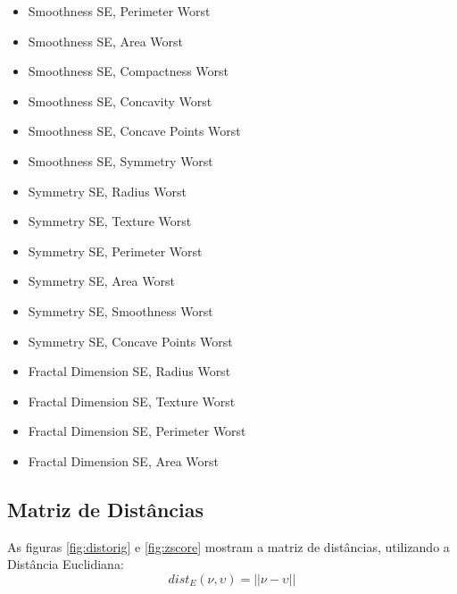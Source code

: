 \documentclass[11pt,a4paper]{article}
\numberwithin{equation}{section}
\begin{document}
\begin{multicols}{2}
\begin{itemize}
\item Smoothness SE, Perimeter Worst
\item Smoothness SE, Area Worst
\item Smoothness SE, Compactness Worst
\item Smoothness SE, Concavity Worst
\item Smoothness SE, Concave Points Worst
\item Smoothness SE, Symmetry Worst
\item Symmetry SE, Radius Worst
\item Symmetry SE, Texture Worst
\item Symmetry SE, Perimeter Worst
\item Symmetry SE, Area Worst
\item Symmetry SE, Smoothness Worst
\item Symmetry SE, Concave Points Worst
\item Fractal Dimension SE, Radius Worst
\item Fractal Dimension SE, Texture Worst
\item Fractal Dimension SE, Perimeter Worst
\item Fractal Dimension SE, Area Worst

\end{itemize}
\end{multicols}

\subsection{Matriz de Distâncias} 

As figuras \ref{fig:distorig} e \ref{fig:zscore} mostram a matriz de distâncias, utilizando a Distância Euclidiana:
\[dist_E(\nu,\upsilon) = ||\nu-\upsilon||\]
\end{document}
